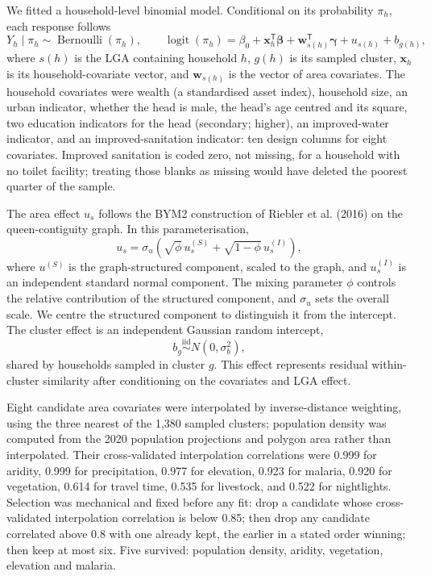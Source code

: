 We fitted a household-level binomial model. Conditional on its probability \(\pi_h\), each response follows
\[
  Y_h \mid \pi_h \sim \operatorname{Bernoulli}(\pi_h),
  \qquad
  \operatorname{logit}(\pi_h)
  = \beta_0 + \mathbf{x}_h^\mathsf{T}\boldsymbol{\beta}
  + \mathbf{w}_{s(h)}^\mathsf{T}\boldsymbol{\gamma}
  + u_{s(h)} + b_{g(h)} ,
\]
where \(s(h)\) is the LGA containing household \(h\), \(g(h)\) is its sampled cluster, \(\mathbf{x}_h\) is its household-covariate vector, and \(\mathbf{w}_{s(h)}\) is the vector of area covariates. The household covariates were wealth (a standardised asset index), household size, an urban indicator, whether the head is male, the head's age centred and its square, two education indicators for the head (secondary; higher), an improved-water indicator, and an improved-sanitation indicator: ten design columns for eight covariates. Improved sanitation is coded zero, not missing, for a household with no toilet facility; treating those blanks as missing would have deleted the poorest quarter of the sample.

The area effect \(u_s\) follows the BYM2 construction of Riebler et al. (2016) on the queen-contiguity graph. In this parameterisation,
\[
  u_s = \sigma_u\!\left(
    \sqrt{\phi}\,u_s^{(S)}
    + \sqrt{1-\phi}\,u_s^{(I)}
  \right),
\]
where \(u^{(S)}\) is the graph-structured component, scaled to the graph, and \(u^{(I)}_s\) is an independent standard normal component. The mixing parameter \(\phi\) controls the relative contribution of the structured component, and \(\sigma_u\) sets the overall scale. We centre the structured component to distinguish it from the intercept. The cluster effect is an independent Gaussian random intercept,
\[
  b_g \stackrel{\mathrm{iid}}{\sim} N(0,\sigma_b^2),
\]
shared by households sampled in cluster \(g\). This effect represents residual within-cluster similarity after conditioning on the covariates and LGA effect.

Eight candidate area covariates were interpolated by inverse-distance weighting, using the three nearest of the 1,380 sampled clusters; population density was computed from the 2020 population projections and polygon area rather than interpolated. Their cross-validated interpolation correlations were 0.999 for aridity, 0.999 for precipitation, 0.977 for elevation, 0.923 for malaria, 0.920 for vegetation, 0.614 for travel time, 0.535 for livestock, and 0.522 for nightlights. Selection was mechanical and fixed before any fit: drop a candidate whose cross-validated interpolation correlation is below 0.85; then drop any candidate correlated above 0.8 with one already kept, the earlier in a stated order winning; then keep at most six. Five survived: population density, aridity, vegetation, elevation and malaria.

